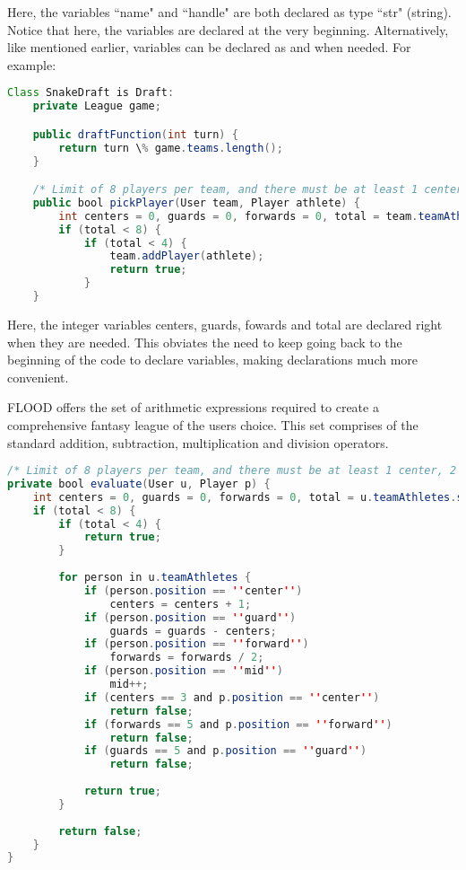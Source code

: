\documentclass[12pt]{report}
\begin{document}
\begin{doublespace}
Here, the variables ``name" and ``handle" are both declared as type ``str" (string). Notice that here, the variables are declared at the very beginning.  Alternatively, like mentioned earlier, variables can be declared as and when needed. For example:
\end{doublespace}

\begin{lstlisting}[language=Java,label=some-code,caption=SnakeDraft.fld]
Class SnakeDraft is Draft:
	private League game;

	public draftFunction(int turn) {
		return turn \% game.teams.length();
	}

	/* Limit of 8 players per team, and there must be at least 1 center, 2 guards and 2 forwards per team. */
	public bool pickPlayer(User team, Player athlete) {
		int centers = 0, guards = 0, forwards = 0, total = team.teamAthletes.size();
		if (total < 8) {
			if (total < 4) {
				team.addPlayer(athlete);
				return true;
			}
	}
\end{lstlisting}

\begin{doublespace}
Here, the integer variables centers, guards, fowards and total are declared right when they are needed. This obviates the need to keep going back to the beginning of the code to declare variables, making declarations much more convenient.

FLOOD offers the set of arithmetic expressions required to create a comprehensive fantasy league of the users choice. This set comprises of the standard  addition, subtraction, multiplication and division operators. 
\end{doublespace}

\begin{lstlisting}[language=Java,label=some-code,caption=SnakeDraft.fld]
/* Limit of 8 players per team, and there must be at least 1 center, 2 guards and 2 forwards per team. */
private bool evaluate(User u, Player p) {
	int centers = 0, guards = 0, forwards = 0, total = u.teamAthletes.size();
	if (total < 8) {
		if (total < 4) {
			return true;
		}
		
		for person in u.teamAthletes {
			if (person.position == ''center'')
				centers = centers + 1;
			if (person.position == ''guard'')
				guards = guards - centers;
			if (person.position == ''forward'')
				forwards = forwards / 2;
			if (person.position == ''mid'')
				mid++;
			if (centers == 3 and p.position == ''center'')
				return false;
			if (forwards == 5 and p.position == ''forward'')
				return false;
			if (guards == 5 and p.position == ''guard'')
				return false;
		
			return true;
		}
	
		return false;
	}
}
\end{lstlisting}
\end{document}
